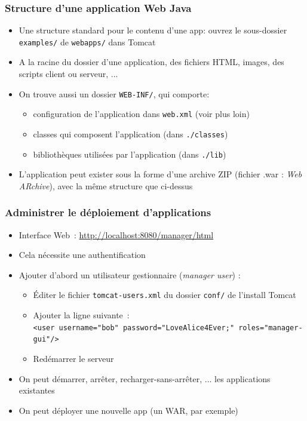 \documentclass{beamer}
\begin{document}
\begin{frame}
	\frametitle{Structure d'une application Web Java}
	\begin{itemize}
		\item Une structure standard pour le contenu d'une app: ouvrez le sous-dossier \texttt{examples/} de \texttt{webapps/} dans Tomcat
		\item A la racine du dossier d'une application, des fichiers HTML,
		images, des scripts client ou serveur, ...
		\item On trouve aussi un dossier \texttt{WEB-INF/}, qui comporte:
		\begin{itemize}
			\item configuration de l'application dans \texttt{web.xml} (voir plus loin)
			\item classes qui composent l'application (dans \texttt{./classes})
			\item bibliothèques utilisées par l'application (dans \texttt{./lib})
		\end{itemize}
		\item L'application peut exister sous la forme d'une archive ZIP
		(fichier .war : \textit{Web ARchive}), avec la même structure que ci-dessus
	\end{itemize}
\end{frame}    

\begin{frame}
	\frametitle{Administrer le déploiement d'applications}
	\begin{itemize}
		\item Interface Web~: \url{http://localhost:8080/manager/html}
		\item Cela nécessite une authentification
		\item Ajouter d'abord un utilisateur gestionnaire (\textit{manager user}) :
		\begin{itemize}
			\item Éditer le fichier \texttt{tomcat-users.xml} du dossier
			\texttt{conf/} de l'install Tomcat
			\item Ajouter la ligne suivante~:\\
			\texttt{<user username="bob" password="LoveAlice4Ever;" roles="manager-gui"/>}
			\item Redémarrer le serveur
		\end{itemize}
		\item On peut démarrer, arrêter, recharger-sans-arrêter, ... les
		applications existantes
		\item On peut déployer une nouvelle app (un WAR, par exemple)
	\end{itemize}
\end{frame}
\end{document}
